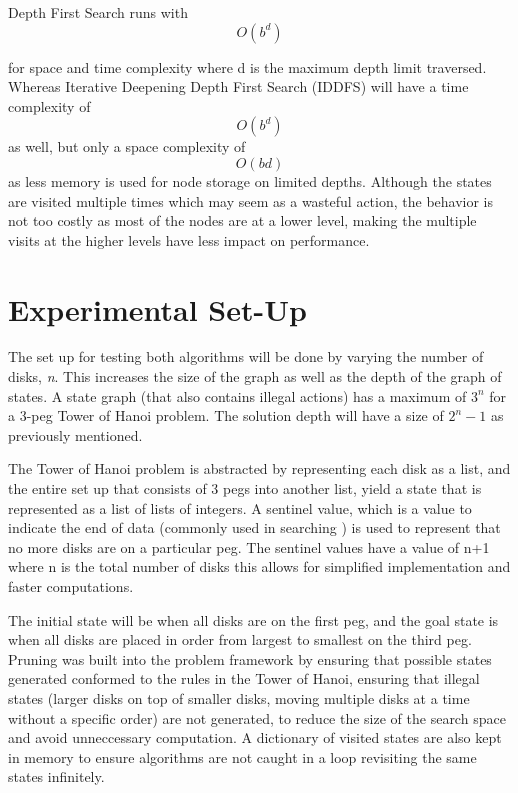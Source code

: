 \documentclass[conference]{IEEEtran}
\begin{document}
Depth First Search runs with 
\begin{equation}
 O(b^{d})
\end{equation}

for space and time complexity where d is the maximum depth limit traversed. Whereas Iterative Deepening Depth First Search (IDDFS) will have a time complexity of \begin{equation}
O(b^{d})
\end{equation} as well, but only a space complexity of \begin{equation} O(bd)\end{equation} as less memory is used for node storage on limited depths. Although the states are visited multiple times which may seem as a wasteful action, the behavior is not too costly as most of the nodes are at a lower level, making the multiple visits at the higher levels have less impact on performance.


\section{Experimental Set-Up}
The set up for testing both algorithms will be done by varying the number of disks, \textit{n}. This increases the size of the graph as well as the depth of the graph of states. A state graph (that also contains illegal actions) has a maximum of $3^n$ for a 3-peg Tower of Hanoi problem. The solution depth will have a size of $2^n-1$ as previously mentioned.

The Tower of Hanoi problem is abstracted by representing each disk as a list, and the entire set up that consists of 3 pegs into another list, yield a state that is represented as a list of lists of integers. A sentinel value, which is a value to indicate the end of data (commonly used in searching \cite{CodeComplete}) is used to represent that no more disks are on a particular peg. The sentinel values have a value of {n+1} where {n} is the total number of disks this allows for simplified implementation and faster computations.

The initial state will be when all disks are on the first peg, and the goal state is when all disks are placed in order from largest to smallest on the third peg. Pruning was built into the problem framework by ensuring that possible states generated conformed to the rules in the Tower of Hanoi, ensuring that illegal states (larger disks on top of smaller disks, moving multiple disks at a time without a specific order) are not generated, to reduce the size of the search space and avoid unneccessary computation. A dictionary of visited states are also kept in memory to ensure algorithms are not caught in a loop revisiting the same states infinitely.
\end{document}
